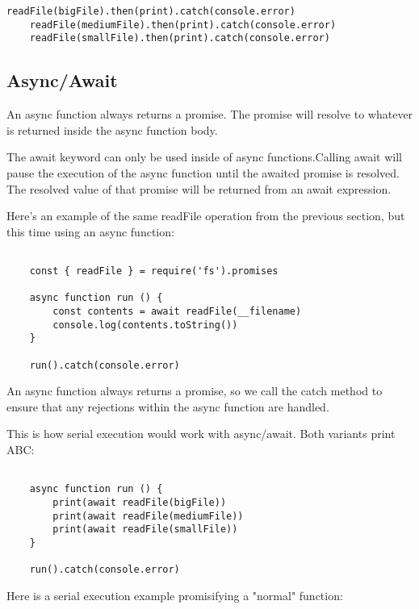 \documentclass{scrartcl}
\begin{document}
\begin{lstlisting}[style=ES6]
    readFile(bigFile).then(print).catch(console.error)
    readFile(mediumFile).then(print).catch(console.error)
    readFile(smallFile).then(print).catch(console.error)
\end{lstlisting}

\subsection{Async/Await}

An async function always returns a promise. The promise will resolve to whatever is returned inside the async function body.

The await keyword can only be used inside of async functions.Calling await will pause the execution of the async function until the awaited promise is resolved. The resolved value of that promise will be returned from an await expression.

Here's an example of the same readFile operation from the previous section, but this time using an async function:

\begin{lstlisting}[style=ES6]

    const { readFile } = require('fs').promises

    async function run () {
        const contents = await readFile(__filename)
        console.log(contents.toString())
    }

    run().catch(console.error)

\end{lstlisting}

An async function always returns a promise, so we call the catch method to ensure that any rejections within the async function are handled.

This is how serial execution would work with async/await. Both variants print ABC:

\begin{lstlisting}[style=ES6]

    async function run () {
        print(await readFile(bigFile))
        print(await readFile(mediumFile))
        print(await readFile(smallFile))
    }

    run().catch(console.error)

\end{lstlisting}

Here is a serial execution example promisifying a "normal" function:
\end{document}
